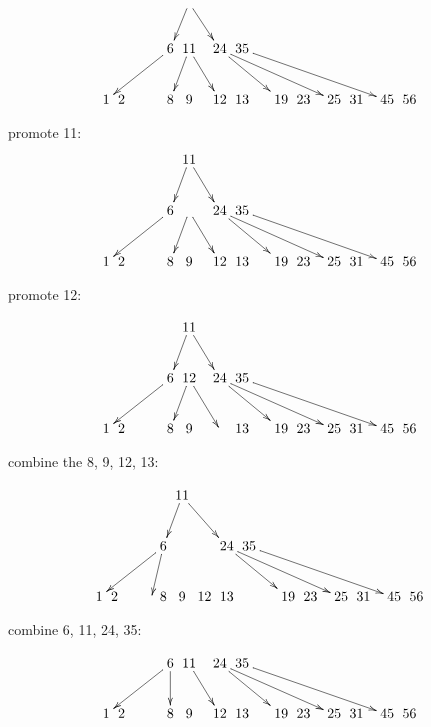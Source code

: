 \documentclass[a4paper]{article}
\begin{document}
$$\xymatrix @C=0pt {
 &  &  &  &  &  &                &\ar[dl]\ar[drr] \\
 &  &  &  &  &  & \ar[dllllll] 6  &\ar[dl] 11 \ar[drr] & &\ar[drrrr]           24 \ar[drrrrrrr] &  35 \ar[drrrrrrrrr] \\
 1 & 2 & & &  &  &  8 & 9 &                   & 12 & 13 & &  & 19 &23 &  & 25 & 31 &  & 45 & 56\\
}$$

promote 11:
$$\xymatrix @C=0pt {
 &  &  &  &  &  &                &\ar[dl] 11\ar[drr] \\
 &  &  &  &  &  & \ar[dllllll] 6  &\ar[dl]  \ar[drr] & &\ar[drrrr]           24 \ar[drrrrrrr] &  35 \ar[drrrrrrrrr] \\
 1 & 2 & & &  &  &  8 & 9 &                   & 12 & 13 & &  & 19 &23 &  & 25 & 31 &  & 45 & 56\\
}$$

promote 12:

$$\xymatrix @C=0pt {
 &  &  &  &  &  &                &\ar[dl] 11\ar[drr] \\
 &  &  &  &  &  & \ar[dllllll] 6  &\ar[dl]  12\ar[drr] & &\ar[drrrr]           24 \ar[drrrrrrr] &  35 \ar[drrrrrrrrr] \\
 1 & 2 & & &  &  &  8 & 9 &                   &  & 13 & &  & 19 &23 &  & 25 & 31 &  & 45 & 56\\
}$$

combine the 8, 9, 12, 13:

$$\xymatrix @C=0pt {
 &  &  &  &  &  &                &\ar[dl] 11\ar[drr] \\
 &  &  &  &  &  & \ar[dllllll] 6  \ar[dl] &  & &\ar[drrrr]           24 \ar[drrrrrrr] &  35 \ar[drrrrrrrrr] \\
 1 & 2 & & &  &  &  8 & 9 & 12                   & 13 & & &  & 19 &23 &  & 25 & 31 &  & 45 & 56\\
}$$

combine 6, 11, 24, 35:

$$\xymatrix @C=0pt {
 &  &  &  &  &  & \ar[dllllll] 6  \ar[d] & 11\ar[drr] & &\ar[drrrr]           24 \ar[drrrrrrr] &  35 \ar[drrrrrrrrr] \\
 1 & 2 & & &  &  &  8 & 9 & & 12                   & 13 & &  & 19 &23 &  & 25 & 31 &  & 45 & 56\\
}$$
\end{document}
